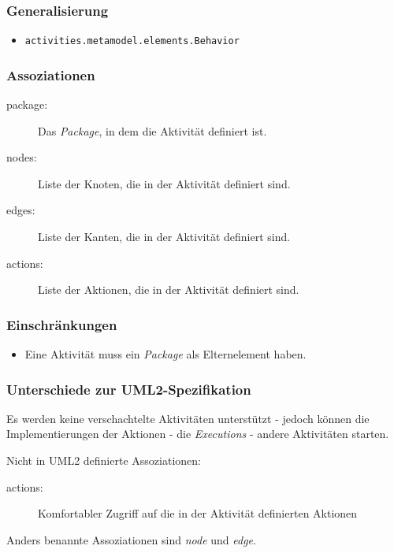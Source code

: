 \subsubsection{Generalisierung}
\begin{itemize}
\item \texttt{activities.metamodel.elements.Behavior}
\end{itemize}

\subsubsection{Assoziationen}
\begin{description}
\item[package:] Das \emph{Package}, in dem die Aktivität definiert ist.
\item[nodes:] Liste der Knoten, die in der Aktivität definiert sind.
\item[edges:] Liste der Kanten, die in der Aktivität definiert sind.
\item[actions:] Liste der Aktionen, die in der Aktivität definiert sind.
\end{description}

\subsubsection{Einschränkungen}
\begin{itemize}
\item Eine Aktivität muss ein \emph{Package} als Elternelement haben.
\end{itemize}

\subsubsection{Unterschiede zur UML2-Spezifikation}
Es werden keine verschachtelte Aktivitäten unterstützt - jedoch können die Implementierungen der Aktionen - die \emph{Executions} - andere Aktivitäten starten.

Nicht in UML2 definierte Assoziationen:
\begin{description}
\item[actions:] Komfortabler Zugriff auf die in der Aktivität definierten Aktionen
\end{description}

Anders benannte Assoziationen sind \emph{node} und \emph{edge}.


